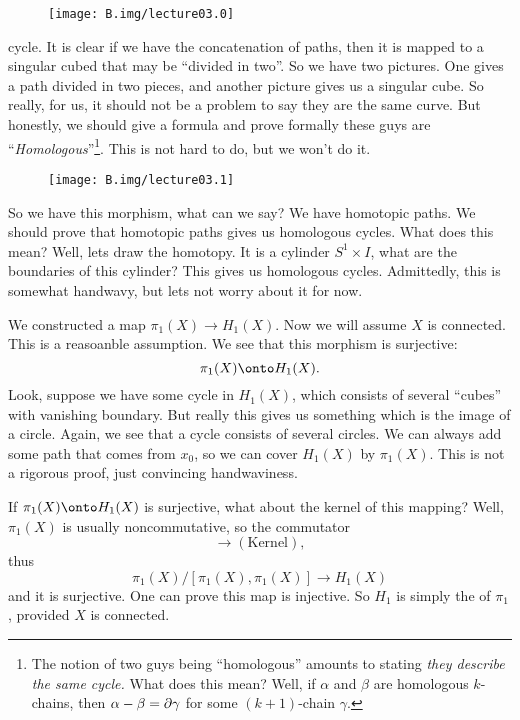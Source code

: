 \begin{wrapfigure}{r}{6pc}
  \vspace{-12pt}
  \texttt{[image: B.img/lecture03.0]}
  \vspace{-12pt}
\end{wrapfigure}
\noindent\ignorespaces %
cycle.
It is clear if we have the concatenation of paths, then it is
mapped to a singular cubed that may be ``divided in two''. So we
have two pictures. One gives a path divided in two pieces, and
another picture gives us a singular cube. So really, for us, it
should not be a problem to say they are the same curve. But
honestly, we should give a formula and prove formally these guys
are ``\emph{Homologous\/}''\footnote{The notion
of two guys being ``homologous'' amounts to stating \emph{they
  describe the same cycle.} What does this mean? Well, if $\alpha$ and $\beta$ are homologous $k$-chains, then $\alpha-\beta=\partial\gamma$ for some $(k+1)$-chain $\gamma$. }. 
This is not hard to do, but we won't do it.

\begin{wrapfigure}{l}{6pc}
  \vspace{-12pt}
  \texttt{[image: B.img/lecture03.1]}
  \vspace{-12pt}
\end{wrapfigure}
So we have this morphism, what can we say?
We have homotopic paths. We should prove that homotopic paths
gives us homologous cycles. 
What does this mean? Well, lets draw the  homotopy. It is a
cylinder $S^1\times I$, what are the boundaries of this cylinder?
This gives us homologous cycles. Admittedly, this is somewhat
handwavy, but lets not worry about it for now.

We constructed a map $\pi_{1}(X)\to H_{1}(X)$. Now we will assume
$X$ is connected. This is a reasoanble assumption. We see that
this morphism is surjective:
\begin{equation}
\pi_{1}(X)\onto H_{1}(X).
\end{equation}
Look, suppose we have some cycle in $H_{1}(X)$, which consists of
several ``cubes'' with vanishing boundary. But really this gives
us something which is the image of a circle. Again, we see that a
cycle consists of several circles. We can always add some path
that comes from $x_{0}$, so we can cover $H_{1}(X)$ by
$\pi_{1}(X)$.
This is not a rigorous proof, just convincing handwaviness.

If $\pi_{1}(X)\onto H_{1}(X)$ is surjective, what about the
kernel of this mapping? Well, $\pi_{1}(X)$ is usually
noncommutative, so the commutator
\begin{equation}
[\pi_{1}(X),\pi_{1}(X)]\to(\mbox{Kernel}),
\end{equation}
thus
\begin{equation}
\pi_{1}(X)/[\pi_{1}(X),\pi_{1}(X)]\to H_{1}(X)
\end{equation}
and it is surjective. One can prove this map is injective. So
$H_{1}$ is simply the
 of $\pi_{1}$,
provided $X$ is connected.

